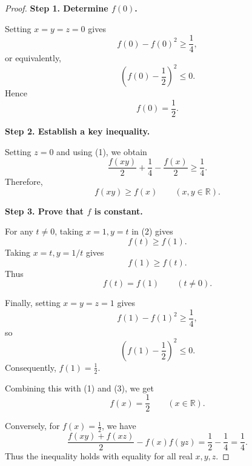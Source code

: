 
\begin{dlsummary}[title={\bfseries Solution 25. Vietnam Mathematical Olympiad 1991},breakable]

\begin{proof}
\textbf{Step 1. Determine $f(0)$.}

Setting $x=y=z=0$ gives
\[
f(0)-f(0)^2\geq\frac14,
\]
or equivalently,
\[
\left(f(0)-\frac12\right)^2\leq0.
\]
Hence
\[
\boxed{f(0)=\frac12.} \tag{1}
\]

\medskip
\noindent
\textbf{Step 2. Establish a key inequality.}

Setting $z=0$ and using (1), we obtain
\[
\frac{f(xy)}2+\frac14-\frac{f(x)}2
\geq\frac14.
\]
Therefore,
\[
\boxed{f(xy)\geq f(x)}
\qquad(x,y\in\mathbb R). \tag{2}
\]

\medskip
\noindent
\textbf{Step 3. Prove that $f$ is constant.}

For any $t\neq0$, taking $x=1,y=t$ in (2)
gives
\[
f(t)\geq f(1).
\]
Taking $x=t,y=1/t$ gives
\[
f(1)\geq f(t).
\]
Thus
\[
f(t)=f(1)\qquad(t\neq0). \tag{3}
\]

Finally, setting $x=y=z=1$ gives
\[
f(1)-f(1)^2\geq\frac14,
\]
so
\[
\left(f(1)-\frac12\right)^2\leq0.
\]
Consequently, $f(1)=\frac12$.

Combining this with (1) and (3), we get
\[
\boxed{f(x)=\frac12\qquad(x\in\mathbb R).}
\]

Conversely, for $f(x)=\frac12$, we have
\[
\frac{f(xy)+f(xz)}2-f(x)f(yz)
=\frac12-\frac14=\frac14.
\]
Thus the inequality holds with equality
for all real $x,y,z$.
\end{proof}

\end{dlsummary}